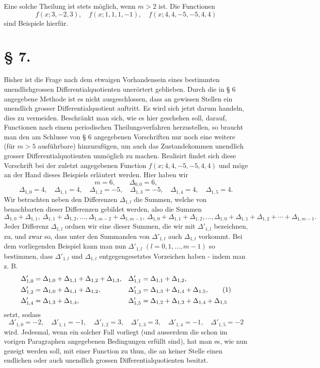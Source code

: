 \documentclass[11pt,a4paper]{article}
\begin{document}
Eine solche Theilung ist stets möglich, wenn $m>2$ ist. Die Functionen
\[
 f(x;3,-2,3),\quad f(x;1,1,1,-1),\quad f(x;4,4,-5,-5,4,4)
\]
sind Beispiele hierfür.

\section*{§ 7.}

Bisher ist die Frage nach dem etwaigen Vorhandensein eines bestimmten unendlichgrossen Differentialquotienten unerörtert geblieben. Durch die in § 6 angegebene Methode ist es nicht ausgeschlossen, dass an gewissen Stellen ein unendlich grosser Differentialquotient auftritt. Es wird sich jetzt darum handeln, dies zu vermeiden. Beschränkt man sich, wie es hier geschehen soll, darauf, Functionen nach einem periodischen Theilungsverfahren herzustellen, so braucht man den am Schlusse von § 6 angegebenen Vorschriften nur noch eine weitere (für $m>5$ ausführbare) hinzuzufügen, um auch das Zustandekommen unendlich grosser Differentialquotienten unmöglich zu machen. Realisirt findet sich diese Vorschrift bei der zuletzt angegebenen Function $f(x;4,4,-5,-5,4,4)$ und möge an der Hand dieses Beispiels erläutert werden. Hier haben wir
\[
 m=6,
 \qquad
 \Delta_{0,0}=6,
\]
\[
 \Delta_{1,0}=4,\quad \Delta_{1,1}=4,\quad \Delta_{1,2}=-5,
 \quad \Delta_{1,3}=-5,
 \quad \Delta_{1,4}=4,
 \quad \Delta_{1,5}=4.
\]
Wir betrachten neben den Differenzen $\Delta_{1,l}$ die Summen, welche von benachbarten dieser Differenzen gebildet werden, also die Summen
\[
 \Delta_{1,0}+\Delta_{1,1},\ \Delta_{1,1}+\Delta_{1,2},\ldots,
 \Delta_{1,m-2}+\Delta_{1,m-1},\
 \Delta_{1,0}+\Delta_{1,1}+\Delta_{1,2},\ldots,
 \Delta_{1,0}+\Delta_{1,1}+\Delta_{1,2}+\cdots+\Delta_{1,m-1}.
\]
Jeder Differenz $\Delta_{1,l}$ ordnen wir eine dieser Summen, die wir mit $\Delta'_{1,l}$ bezeichnen, zu, und zwar so, dass unter den Summanden von $\Delta'_{1,l}$ auch $\Delta_{1,l}$ vorkommt. Bei dem vorliegenden Beispiel kann man nun $\Delta'_{1,l}$ $(l=0,1,\ldots,m-1)$ so bestimmen, dass $\Delta'_{1,l}$ und $\Delta_{1,l}$ entgegengesetztes Vorzeichen haben - indem man z. B.
\begin{align}
 \Delta'_{1,0}&=\Delta_{1,0}+\Delta_{1,1}+\Delta_{1,2}+\Delta_{1,3},
 &\Delta'_{1,1}&=\Delta_{1,1}+\Delta_{1,2},\notag\\
 \Delta'_{1,2}&=\Delta_{1,0}+\Delta_{1,1}+\Delta_{1,2},
 &\Delta'_{1,3}&=\Delta_{1,3}+\Delta_{1,4}+\Delta_{1,5},\tag{1}\\
 \Delta'_{1,4}&=\Delta_{1,3}+\Delta_{1,4},
 &\Delta'_{1,5}&=\Delta_{1,2}+\Delta_{1,3}+\Delta_{1,4}+\Delta_{1,5}
\notag
\end{align}
setzt, sodass
\[
 \Delta'_{1,0}=-2,
 \quad \Delta'_{1,1}=-1,
 \quad \Delta'_{1,2}=3,
 \quad \Delta'_{1,3}=3,
 \quad \Delta'_{1,4}=-1,
 \quad \Delta'_{1,5}=-2
\]
wird. Jedesmal, wenn ein solcher Fall vorliegt (und ausserdem die schon im vorigen Paragraphen angegebenen Bedingungen erfüllt sind), hat man es, wie nun gezeigt werden soll, mit einer Function zu thun, die an keiner Stelle einen endlichen oder auch unendlich grossen Differentialquotienten besitzt.
\end{document}
